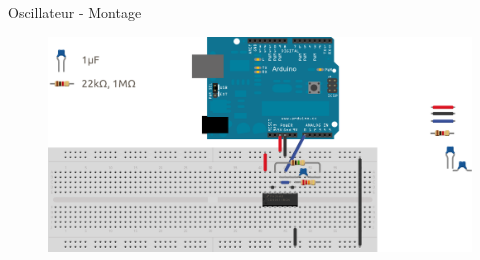 \documentclass{beamer}
\begin{document}
\begin{frame}{Oscillateur - Montage}
	\begin{figure}
		\centering
		\includegraphics[width=\textwidth,height=0.9\textheight,keepaspectratio]{sysdig_clock}
	\end{figure}
\end{frame}
\end{document}
